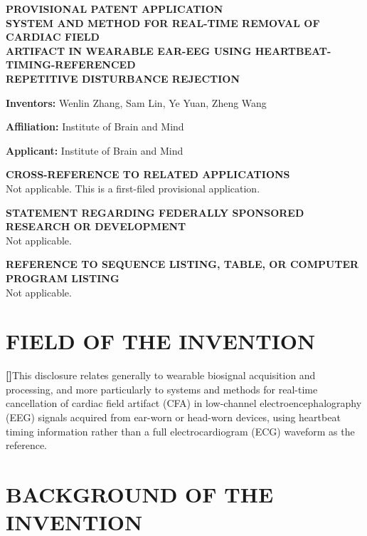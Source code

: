\documentclass[12pt]{article}
\newcounter{para}
\newcommand{\parnum}{\stepcounter{para}\noindent\textbf{[\thepara]}\quad}
\begin{document}
\begin{center}
{\large\bfseries PROVISIONAL PATENT APPLICATION}\\[0.3em]
{\large\bfseries SYSTEM AND METHOD FOR REAL-TIME REMOVAL OF CARDIAC FIELD\\
ARTIFACT IN WEARABLE EAR-EEG USING HEARTBEAT-TIMING-REFERENCED\\
REPETITIVE DISTURBANCE REJECTION}
\end{center}

\vspace{1em}
\noindent\textbf{Inventors:} Wenlin Zhang, Sam Lin, Ye Yuan, Zheng Wang

\noindent\textbf{Affiliation:} Institute of Brain and Mind

\noindent\textbf{Applicant:} Institute of Brain and Mind

\vspace{1em}
\noindent\textbf{CROSS-REFERENCE TO RELATED APPLICATIONS}\\
Not applicable. This is a first-filed provisional application.

\vspace{0.5em}
\noindent\textbf{STATEMENT REGARDING FEDERALLY SPONSORED RESEARCH OR DEVELOPMENT}\\
Not applicable.

\vspace{0.5em}
\noindent\textbf{REFERENCE TO SEQUENCE LISTING, TABLE, OR COMPUTER PROGRAM LISTING}\\
Not applicable.

\section*{FIELD OF THE INVENTION}

\parnum This disclosure relates generally to wearable biosignal acquisition and processing, and more particularly to systems and methods for real-time cancellation of cardiac field artifact (CFA) in low-channel electroencephalography (EEG) signals acquired from ear-worn or head-worn devices, using heartbeat timing information rather than a full electrocardiogram (ECG) waveform as the reference.

\section*{BACKGROUND OF THE INVENTION}
\end{document}
